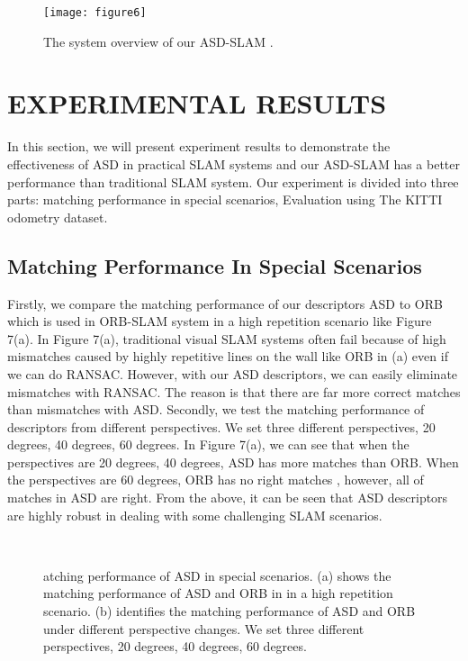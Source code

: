\documentclass[letterpaper, 10 pt, conference]{ieeeconf}  %
\begin{document}
\begin{figure}[h]
\centering
\texttt{[image: figure6]}
\caption{The system overview of our ASD-SLAM .}
\end{figure}
\section{EXPERIMENTAL RESULTS}
In this section, we will present experiment results to demonstrate the effectiveness of ASD in practical SLAM systems and our ASD-SLAM has a better performance than  traditional SLAM system. Our experiment is divided into three parts:  matching performance in special scenarios, Evaluation using The KITTI odometry dataset. 

\subsection{Matching Performance In Special Scenarios}
Firstly, we compare the matching performance of our descriptors ASD to ORB which is used in ORB-SLAM system in a high repetition scenario like Figure 7(a).  In Figure 7(a), traditional visual SLAM systems often fail because of high mismatches caused by highly repetitive lines on the wall like ORB in (a) even if we can do RANSAC. However, with our ASD descriptors, we can easily eliminate mismatches with RANSAC. The reason is that there are far more correct matches than mismatches with ASD.
Secondly, we test the matching performance of descriptors from different perspectives. We set three different perspectives, 20 degrees, 40 degrees, 60 degrees. In Figure 7(a), we can see that when the perspectives are 20 degrees, 40 degrees, ASD has more matches than ORB. When the perspectives are 60 degrees, ORB has no right matches , however, all of matches in ASD are right. From the above, it can be seen that ASD descriptors are highly robust in dealing with some challenging SLAM scenarios.

\begin{figure}[htbp]
\centering
{}%
\\
%

\caption{atching performance of  ASD in special scenarios. (a) shows the matching performance of ASD and ORB in in a high repetition scenario.  (b) identifies the matching performance of ASD and ORB under different perspective changes. We set three different perspectives, 20 degrees,  40 degrees,  60 degrees.} 
\end{figure}
\end{document}

